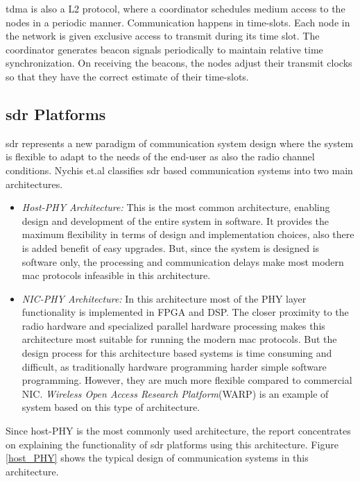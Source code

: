 \ac{tdma} is also a \ac{L2} protocol, where a coordinator schedules medium access to the nodes in a periodic manner.
Communication happens in time-slots.
Each node in the network is given exclusive access to transmit during its time slot.
The coordinator generates beacon signals periodically to maintain relative time synchronization. On receiving the beacons, the nodes adjust their transmit clocks so that they have the correct estimate of their time-slots.
 
 

\subsection{\ac{sdr} Platforms}

\ac{sdr} represents a new paradigm of communication system design where the system is flexible to adapt to the needs of the end-user as also the radio channel conditions. Nychis et.al \cite{nychis_enabling_nodate} classifies \ac{sdr} based communication systems into two main architectures.
\begin{itemize} 
\item{\textit{Host-PHY Architecture:} This is the most common architecture, enabling design and development of the entire system in software.
It provides the maximum flexibility in terms of design and implementation choices, also there is added benefit of easy upgrades.
But, since the system is designed is software only, the processing and communication delays make most modern \ac{mac} protocols infeasible in this architecture.}


\item{\textit{NIC-PHY Architecture:} In this architecture most of the \ac{PHY} layer functionality is implemented in \ac{FPGA} and \ac{DSP}.
The closer proximity to the radio hardware and specialized parallel hardware processing makes this architecture most suitable for running the modern \ac{mac} protocols.
But the design process for this architecture based systems is time consuming and difficult, as traditionally hardware programming harder simple software programming.
However, they are much more flexible compared to commercial \ac{NIC}.
\textit{Wireless Open Access Research Platform}(WARP) \cite{noauthor_warp_nodate} is an example of system based on this type of architecture.}

\end{itemize}
Since host-PHY \cite{nychis_enabling_nodate} is the most commonly used architecture, the report concentrates on explaining the functionality of \ac{sdr} platforms using this architecture.
Figure \ref{host_PHY} shows the typical design of communication systems in this architecture.


